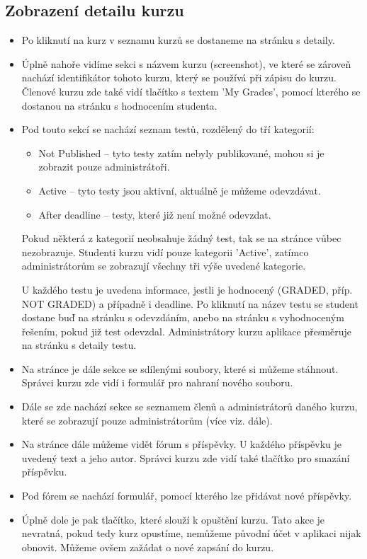 \subsection{Zobrazení detailu kurzu}

\begin{itemize}
	\item Po kliknutí na kurz v seznamu kurzů se dostaneme na stránku s detaily.
	\item Úplně nahoře vidíme sekci s názvem kurzu (screenshot), ve které se zároveň nachází identifikátor tohoto kurzu, který se používá při zápisu do kurzu. Členové kurzu zde také vidí tlačítko s textem 'My Grades', pomocí kterého se dostanou na stránku s hodnocením studenta.
	\item Pod touto sekcí se nachází seznam testů, rozdělený do tří kategorií:
		\begin{itemize}
			\item Not Published -- tyto testy zatím nebyly publikované, mohou si je zobrazit pouze administrátoři.
			\item Active -- tyto testy jsou aktivní, aktuálně je můžeme odevzdávat.
			\item After deadline -- testy, které již není možné odevzdat.
		\end{itemize}
		Pokud některá z kategorií neobsahuje žádný test, tak se na stránce vůbec nezobrazuje. Studenti kurzu vidí pouze kategorii 'Active', zatímco administrátorům se zobrazují všechny tři výše uvedené kategorie.
		
		U každého testu je uvedena informace, jestli je hodnocený (GRADED, příp. NOT GRADED) a případně i deadline.
		Po kliknutí na název testu se student dostane buď na stránku s odevzdáním, anebo na stránku s vyhodnoceným řešením, pokud již test odevzdal. Administrátory kurzu aplikace přesměruje na stránku s detaily testu.
		
	\item Na stránce je dále sekce se sdílenými soubory, které si můžeme stáhnout. Správci kurzu zde vidí i formulář pro nahraní nového souboru.
	\item Dále se zde nachází sekce se seznamem členů a administrátorů daného kurzu, které se zobrazují pouze administrátorům (více viz. dále).
	\item Na stránce dále můžeme vidět fórum s příspěvky. U každého příspěvku je uvedený text a jeho autor. Správci kurzu zde vidí také tlačítko pro smazání příspěvku.
	\item Pod fórem se nachází formulář, pomocí kterého lze přidávat nové příspěvky.
	\item Úplně dole je pak tlačítko, které slouží k opuštění kurzu. Tato akce je nevratná, pokud tedy kurz opustíme, nemůžeme původní účet v aplikaci nijak obnovit. Můžeme ovšem zažádat o nové zapsání do kurzu.
\end{itemize}

